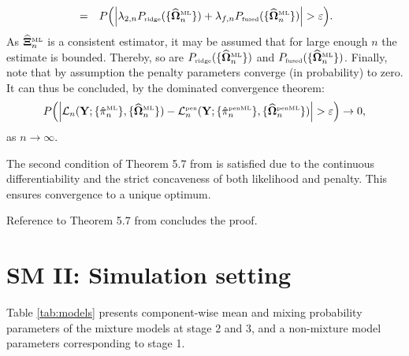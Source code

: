 \documentclass[10pt]{article}
\makeatletter
\newcommand{\proofname}{Proof.}
\newcounter{proof}\newcounter{currproofctr}\newcounter{endproofctr}%
\newenvironment{proof}[1][\proofname]{
  \th@nonumberplain
  \def\theorem@headerfont{\itshape}%
  \normalfont
  \@thm{proof}{proof}{#1}}%
  {\@endtheorem}
\makeatother
\begin{document}
\begin{proof}
\begin{eqnarray*}
\\
& = & P \Big( \Big| \lambda_{2,n} P_{\mbox{{\tiny ridge}}}( \{\widehat{\mathbf{\Omega}}_n^{\mbox{{\tiny ML}}} \}) + \lambda_{f,n} P_{\mbox{{\tiny fused}}}( \{\widehat{\mathbf{\Omega}}_n^{\mbox{{\tiny ML}}} \}) \Big| > \varepsilon \Big).
\end{eqnarray*}
As $\widehat{\mathbf{\Xi}}_n^{\mbox{{\tiny ML}}}$ is a consistent estimator, it may be assumed that for large enough $n$ the estimate is bounded. Thereby, so are $P_{\mbox{{\tiny ridge}}}( \{\widehat{\mathbf{\Omega}}_n^{\mbox{{\tiny ML}}} \})$ and $P_{\mbox{{\tiny fused}}}( \{\widehat{\mathbf{\Omega}}_n^{\mbox{{\tiny ML}}} \})$. Finally, note that by assumption the penalty parameters converge (in probability) to zero. It can thus be concluded, by the dominated convergence theorem:
\begin{eqnarray*}
P \Big( \Big| \mathcal{L}_n (\mathbf{Y}; \{ \hat{\pi}_n^{\mbox{{\tiny ML}}} \}, \{ \widehat{\mathbf{\Omega}}_n^{\mbox{{\tiny ML}}} \} ) - \mathcal{L}_n^{\mbox{{\tiny pen}} }(\mathbf{Y}; \{ \hat{\pi}_n^{\mbox{{\tiny penML}}} \}, \{\widehat{\mathbf{\Omega}}_n^{\mbox{{\tiny penML}}} \} ) \Big| > \varepsilon  \Big) \rightarrow 0,
\end{eqnarray*}
as $n \rightarrow \infty$.

The second condition of Theorem 5.7 from \cite{VdVa2000} is satisfied due to the continuous differentiability and the strict concaveness of both likelihood and penalty. This ensures convergence to a unique optimum.

Reference to  Theorem 5.7 from \cite{VdVa2000} concludes the proof.
\end{proof}
\setlength{\bibsep}{2pt}



\newpage
\section*{SM II: Simulation setting}
\label{SMII}

Table \ref{tab:models} presents component-wise mean and mixing probability parameters of the mixture models at stage 2 and 3, and a non-mixture model parameters corresponding to stage 1. 
\end{document}
